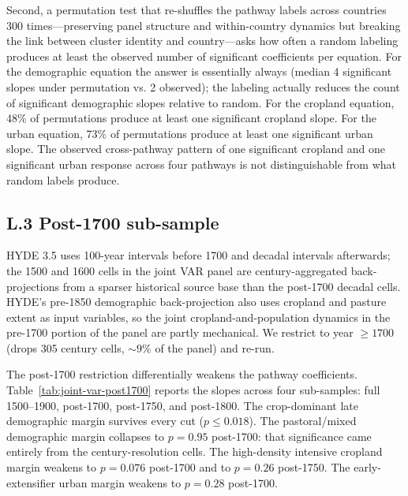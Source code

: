 \documentclass[11pt,letterpaper]{article}
\begin{document}
Second, a permutation test that re-shuffles the pathway labels across countries 300 times---preserving panel structure and within-country dynamics but breaking the link between cluster identity and country---asks how often a random labeling produces at least the observed number of significant coefficients per equation. For the demographic equation the answer is essentially always (median 4 significant slopes under permutation vs. 2 observed); the labeling actually reduces the count of significant demographic slopes relative to random. For the cropland equation, 48\% of permutations produce at least one significant cropland slope. For the urban equation, 73\% of permutations produce at least one significant urban slope. The observed cross-pathway pattern of one significant cropland and one significant urban response across four pathways is not distinguishable from what random labels produce.

\subsection*{L.3 Post-1700 sub-sample}
\label{app:joint-var-post1700}

HYDE 3.5 uses 100-year intervals before 1700 and decadal intervals afterwards; the 1500 and 1600 cells in the joint VAR panel are century-aggregated back-projections from a sparser historical source base than the post-1700 decadal cells. HYDE's pre-1850 demographic back-projection also uses cropland and pasture extent as input variables, so the joint cropland-and-population dynamics in the pre-1700 portion of the panel are partly mechanical. We restrict to year $\ge 1700$ (drops 305 century cells, $\sim 9\%$ of the panel) and re-run.

The post-1700 restriction differentially weakens the pathway coefficients. Table~\ref{tab:joint-var-post1700} reports the slopes across four sub-samples: full 1500--1900, post-1700, post-1750, and post-1800. The crop-dominant late demographic margin survives every cut ($p \le 0.018$). The pastoral/mixed demographic margin collapses to $p = 0.95$ post-1700: that significance came entirely from the century-resolution cells. The high-density intensive cropland margin weakens to $p = 0.076$ post-1700 and to $p = 0.26$ post-1750. The early-extensifier urban margin weakens to $p = 0.28$ post-1700.
\end{document}
